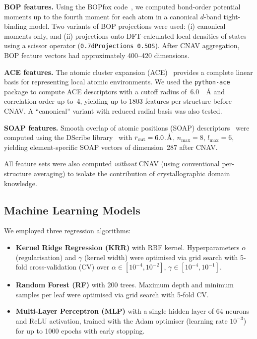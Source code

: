 \textbf{BOP features.} Using the BOPfox code~\cite{bopfox}, we computed bond-order potential moments up to the fourth moment for each atom in a canonical $d$-band tight-binding model. Two variants of BOP projections were used: (i) canonical moments only, and (ii) projections onto DFT-calculated local densities of states using a scissor operator (\texttt{0.7dProjections 0.5OS}). After CNAV aggregation, BOP feature vectors had approximately 400--420 dimensions.

\textbf{ACE features.} The atomic cluster expansion (ACE)~\cite{ace} provides a complete linear basis for representing local atomic environments. We used the \texttt{python-ace} package to compute ACE descriptors with a cutoff radius of~\SI{6.0}{\textnormal{~\AA}} and correlation order up to~4, yielding up to 1803 features per structure before CNAV. A ``canonical'' variant with reduced radial basis was also tested.

\textbf{SOAP features.} Smooth overlap of atomic positions (SOAP) descriptors~\cite{soap} were computed using the DScribe library~\cite{dsribe} with $r_\text{cut} = \SI{6.0}{\textnormal{~\AA}}$, $n_\text{max} = 8$, $l_\text{max} = 6$, yielding element-specific SOAP vectors of dimension~287 after CNAV.

All feature sets were also computed \textit{without} CNAV (using conventional per-structure averaging) to isolate the contribution of crystallographic domain knowledge.

\subsection{Machine Learning Models}

We employed three regression algorithms:

\begin{itemize}
  \item \textbf{Kernel Ridge Regression (KRR)} with RBF kernel. Hyperparameters $\alpha$ (regularisation) and $\gamma$ (kernel width) were optimised via grid search with 5-fold cross-validation (CV) over $\alpha \in [10^{-4}, 10^{-2}]$, $\gamma \in [10^{-4}, 10^{-1}]$.
  \item \textbf{Random Forest (RF)} with 200 trees. Maximum depth and minimum samples per leaf were optimised via grid search with 5-fold CV.
  \item \textbf{Multi-Layer Perceptron (MLP)} with a single hidden layer of 64 neurons and ReLU activation, trained with the Adam optimiser (learning rate $10^{-3}$) for up to 1000 epochs with early stopping.
\end{itemize}

